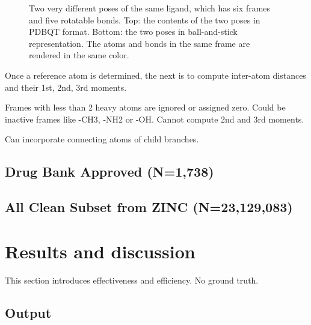 \documentclass[twocolumn]{svjour3}          %
\begin{document}
\begin{figure}
\endminipage
\caption{Two very different poses of the same ligand, which has six frames and five rotatable bonds. Top: the contents of the two poses in PDBQT format. Bottom: the two poses in ball-and-stick representation. The atoms and bonds in the same frame are rendered in the same color.}
\label{fig:T27}
\end{figure}

Once a reference atom is determined, the next is to compute inter-atom distances and their 1st, 2nd, 3rd moments.

Frames with less than 2 heavy atoms are ignored or assigned zero. Could be inactive frames like -CH3, -NH2 or -OH. Cannot compute 2nd and 3rd moments.

Can incorporate connecting atoms of child branches.

\subsection{Drug Bank Approved (N=1,738)}

\subsection{All Clean Subset from ZINC (N=23,129,083)}

\section{Results and discussion}

This section introduces effectiveness and efficiency. No ground truth.

\subsection{Output}
\end{document}
